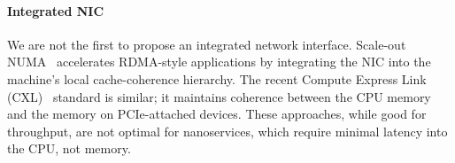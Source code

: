\paragraph{Integrated NIC} We are not the first to propose an integrated network interface.
Scale-out NUMA~\cite{scale-out-numa} accelerates RDMA-style applications by integrating the NIC into the machine's local cache-coherence hierarchy. The recent Compute Express Link (CXL)~\cite{cxl} standard is similar; it maintains coherence between the CPU memory and the memory on PCIe-attached devices. These approaches, while good for throughput, are not optimal for nanoservices, which require minimal latency into the CPU, not memory.


